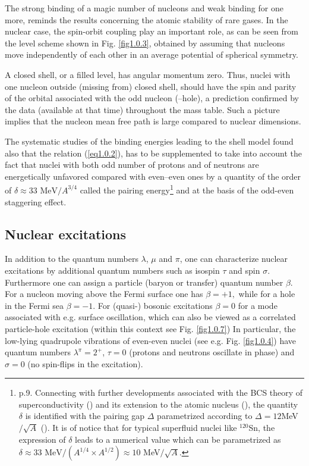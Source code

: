 The strong binding of a magic number of nucleons and weak binding for one more, reminds the results  concerning the atomic stability of rare gases. In the nuclear case,  the spin-orbit coupling play an important role, as can be seen from the level scheme shown in Fig. \ref{fig1.0.3}, obtained by assuming that nucleons move independently of each other in an average potential  of  spherical symmetry.


A closed shell, or a filled level, has angular momentum zero. Thus, nuclei with one nucleon outside (missing from) closed shell, should have the spin and parity of the orbital associated with the odd nucleon (--hole), a prediction confirmed by the data (available at that time) throughout the mass table. Such a picture implies that the nucleon mean free path is large compared to nuclear dimensions.


The systematic studies of the binding energies leading to the shell model found also that the relation (\ref{eq1.0.2}), has to be supplemented to take into account the fact that nuclei with both odd number of protons and of neutrons are energetically unfavored compared with even--even ones by a quantity of the order of $\delta\approx33\text{ MeV}/A^{3/4}$ called the pairing energy\footnote{\label{foot2} \cite{Mayer:55} p.9. Connecting with further developments associated with the BCS theory of superconductivity (\cite{Bardeen:57a,Bardeen:57b}) and its extension to the atomic nucleus (\cite{Bohr:58}), the quantity $\delta$ is identified with the pairing gap $\Delta$ parametrized according to $\Delta=12 $MeV$/\sqrt{A}$ (\cite{Bohr:69}). It is of notice that for typical superfluid nuclei like $^{120}$Sn, the expression of $\delta$ leads to a numerical value which can be parametrized as  $\delta\approx33\text{ MeV}/(A^{1/4}\times A^{1/2})\approx10$ MeV$/\sqrt{A}$.} and at the basis of the odd-even staggering effect.

\subsection{Nuclear excitations}\label{S1.1.2}
In addition to the quantum numbers $\lambda$,  $\mu$ and $\pi$, one can characterize nuclear excitations by additional quantum numbers such as isospin $\tau$ and spin $\sigma$. Furthermore one can assign a particle (baryon or transfer) quantum number $\beta$. For a nucleon moving above the Fermi surface one has $\beta=+1,$ while for a hole in the Fermi sea $\beta=-1$. For (quasi-) bosonic excitations $\beta=0$ for a mode associated with e.g. surface oscillation, which can also be viewed as a correlated particle-hole excitation (within this context see Fig. \ref{fig1.0.7}) In particular, the low-lying quadrupole vibrations of even-even nuclei (see e.g. Fig. \ref{fig1.0.4}) have quantum numbers $\lambda^\pi=2^+$, $\tau=0$ (protons and neutrons oscillate in phase) and $\sigma=0$ (no spin-flips in the excitation).

